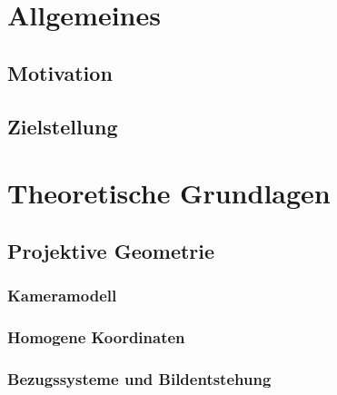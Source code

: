\documentclass[a4paper,12pt]{report}
\begin{document}

\begin{titlepage}
	
\end{titlepage}

\newpage
\newpage

\tableofcontents
\listoffigures


\chapter{Allgemeines}
	\section{Motivation}
		
	\section{Zielstellung}
		
\chapter{Theoretische Grundlagen}\label{chap:theoretische_grundlagen}
	\section{Projektive Geometrie}\label{sec:projektive_geometrie}
		
		\subsection{Kameramodell}\label{subsec:kameramodell}
			
		\subsection{Homogene Koordinaten}\label{subsec:homogene_koordinaten}
			
		\subsection{Bezugssysteme und Bildentstehung}\label{subsec:bezugssysteme_bildentstehung}
			
\end{document}
